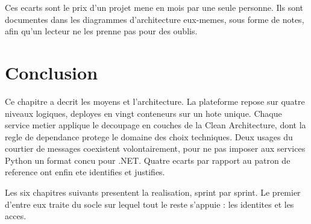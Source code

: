 Ces ecarts sont le prix d'un projet mene en \stageDuree{} mois par une
seule personne. Ils sont documentes dans les diagrammes d'architecture
eux-memes, sous forme de notes, afin qu'un lecteur ne les prenne pas pour
des oublis.

\section*{Conclusion}

Ce chapitre a decrit les moyens et l'architecture. La plateforme repose
sur quatre niveaux logiques, deployes en vingt conteneurs sur un hote
unique. Chaque service metier applique le decoupage en couches de la
Clean Architecture, dont la regle de dependance protege le domaine des
choix techniques. Deux usages du courtier de messages coexistent
volontairement, pour ne pas imposer aux services Python un format concu
pour .NET. Quatre ecarts par rapport au patron de reference ont enfin ete
identifies et justifies.

Les six chapitres suivants presentent la realisation, sprint par sprint.
Le premier d'entre eux traite du socle sur lequel tout le reste
s'appuie : les identites et les acces.
